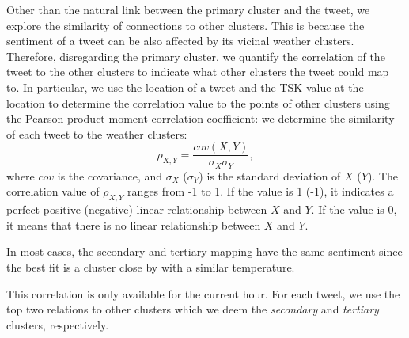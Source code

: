 
Other than the natural link between the primary cluster and the tweet, we explore the similarity of connections to other clusters. %
This is because the sentiment of a tweet can be also affected by its vicinal weather clusters. Therefore, disregarding the primary cluster, we quantify the correlation of the tweet to the other clusters to indicate what other clusters the tweet could map to. In particular, we use the location of a tweet and the TSK value at the location to determine the correlation value to the points of other clusters using the Pearson product-moment correlation coefficient: we determine the similarity of each tweet to the weather clusters:
\begin{equation}
\label{eq:pearson}
\rho_{X,Y}=\frac{cov(X,Y)}{\sigma_{X}\sigma_{Y}},
\end{equation}
where $cov$ is the covariance, and $\sigma_{X}$ ($\sigma_{Y}$) is the standard deviation of $X$ ($Y$).  The correlation value of $\rho_{X,Y}$ ranges from -1 to 1. If the value is 1 (-1), it indicates a perfect positive (negative) linear relationship between $X$ and $Y$. If the value is 0, it means that there is no linear relationship between $X$ and $Y$.





In most cases, the secondary and tertiary mapping have the same sentiment since the best fit is a cluster close by with a similar temperature.





This correlation is only available for the current hour. For each tweet, we use the top two relations to other clusters which we deem the \emph{secondary} and \emph{tertiary} clusters, respectively. 


